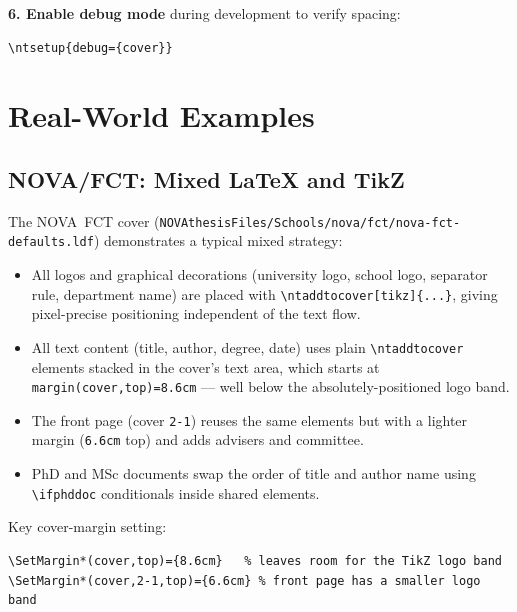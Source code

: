 \medskip
\noindent\textbf{6.  Enable debug mode} during development to verify spacing:
\begin{verbatim}
\ntsetup{debug={cover}}
\end{verbatim}


\section{Real-World Examples}
\label{sec:covers_examples}

\subsection{NOVA/FCT: Mixed LaTeX and TikZ}
\label{sec:covers_nova_fct}

The NOVA~FCT cover (\verb!NOVAthesisFiles/Schools/nova/fct/nova-fct-defaults.ldf!)
demonstrates a typical mixed strategy:

\begin{itemize}
  \item All logos and graphical decorations (university logo, school logo,
        separator rule, department name) are placed with
        \verb!\ntaddtocover[tikz]{...}!, giving pixel-precise positioning
        independent of the text flow.
  \item All text content (title, author, degree, date) uses plain
        \verb!\ntaddtocover! elements stacked in the cover's text area, which
        starts at \texttt{margin(cover,top)=8.6cm} — well below the
        absolutely-positioned logo band.
  \item The front page (cover \texttt{2-1}) reuses the same elements but with
        a lighter margin (\texttt{6.6cm} top) and adds advisers and committee.
  \item PhD and MSc documents swap the order of title and author name using
        \verb!\ifphddoc! conditionals inside shared elements.
\end{itemize}

Key cover-margin setting:
\begin{verbatim}
\SetMargin*(cover,top)={8.6cm}   % leaves room for the TikZ logo band
\SetMargin*(cover,2-1,top)={6.6cm} % front page has a smaller logo band
\end{verbatim}

